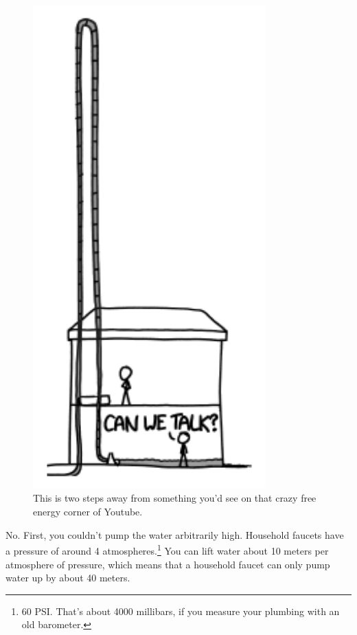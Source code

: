 {\begin{figure}[!htbp]
\centering
\includegraphics[scale=0.5, max width=0.8\textwidth]{imgs/a/91/faucet_fountain.png}
\caption{This is two steps away from something you'd see on that crazy free energy corner of Youtube.}
\end{figure}

{No. First, you couldn't pump the water arbitrarily high. Household faucets have a pressure of around 4 atmospheres.{\footnote{60 PSI. That's about 4000 millibars, if you measure your plumbing with an old barometer.} } You can lift water about 10 meters per atmosphere of pressure, which means that a household faucet can only pump water up by about 40 meters.}

}
